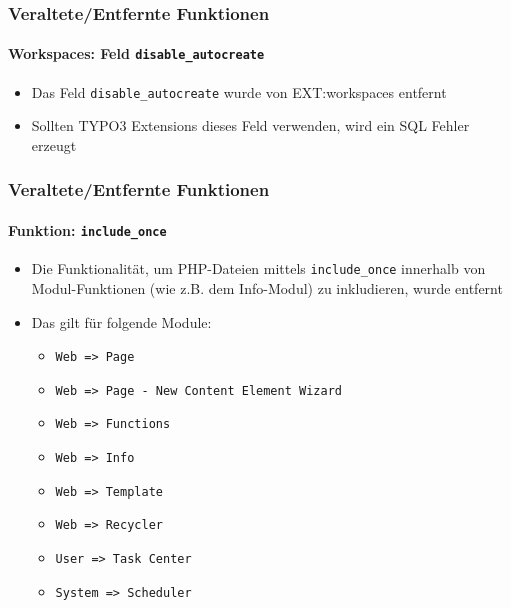 \begin{frame}[fragile]
	\frametitle{Veraltete/Entfernte Funktionen}
	\framesubtitle{Workspaces: Feld \texttt{disable\_autocreate}}

	\begin{itemize}
		\item Das Feld \texttt{disable\_autocreate} wurde von EXT:workspaces entfernt
		\item Sollten TYPO3 Extensions dieses Feld verwenden, wird ein SQL Fehler erzeugt
	\end{itemize}

\end{frame}


\begin{frame}[fragile]
	\frametitle{Veraltete/Entfernte Funktionen}
	\framesubtitle{Funktion: \texttt{include\_once}}

	\begin{itemize}

		\item Die Funktionalität, um PHP-Dateien mittels \texttt{include\_once}
			innerhalb von Modul-Funktionen (wie z.B. dem Info-Modul) zu inkludieren,
			wurde entfernt

		\item Das gilt für folgende Module:

			\begin{itemize}
				\item \texttt{Web => Page}
				\item \texttt{Web => Page - New Content Element Wizard}
				\item \texttt{Web => Functions}
				\item \texttt{Web => Info}
				\item \texttt{Web => Template}
				\item \texttt{Web => Recycler}
				\item \texttt{User => Task Center}
				\item \texttt{System => Scheduler}
			\end{itemize}

	\end{itemize}

\end{frame}

